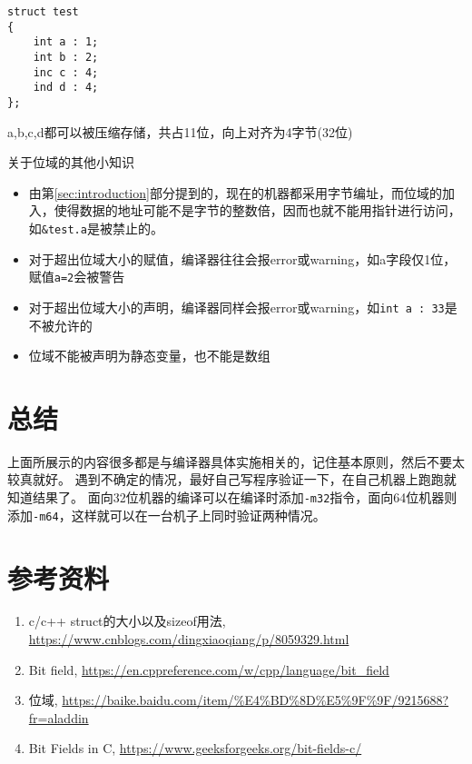\documentclass[compact]{note}
\begin{document}
\begin{example}
\begin{lstlisting}
struct test
{
    int a : 1;
    int b : 2;
    inc c : 4;
    ind d : 4;
};
\end{lstlisting}
\end{example}
\begin{analysis}
a,b,c,d都可以被压缩存储，共占11位，向上对齐为4字节(32位)
\end{analysis}

关于位域的其他小知识
\begin{itemize}
	\itemsep -3pt
	\item 由第\ref{sec:introduction}部分提到的，现在的机器都采用字节编址，而位域的加入，使得数据的地址可能不是字节的整数倍，因而也就不能用指针进行访问，如\verb'&test.a'是被禁止的。
	\item 对于超出位域大小的赋值，编译器往往会报error或warning，如a字段仅1位，赋值\verb'a=2'会被警告
	\item 对于超出位域大小的声明，编译器同样会报error或warning，如\verb'int a : 33'是不被允许的
	\item 位域不能被声明为静态变量，也不能是数组
\end{itemize}

\section{总结}
上面所展示的内容很多都是与编译器具体实施相关的，记住基本原则，然后不要太较真就好。
遇到不确定的情况，最好自己写程序验证一下，在自己机器上跑跑就知道结果了。
面向32位机器的编译可以在编译时添加\verb'-m32'指令，面向64位机器则添加\verb'-m64'，这样就可以在一台机子上同时验证两种情况。

\section{参考资料}
\begin{enumerate}
	\itemsep -3pt
	\item c/c++ struct的大小以及sizeof用法, \url{https://www.cnblogs.com/dingxiaoqiang/p/8059329.html}
	\item Bit field, \url{https://en.cppreference.com/w/cpp/language/bit_field}
	\item 位域, \url{https://baike.baidu.com/item/%E4%BD%8D%E5%9F%9F/9215688?fr=aladdin}
	\item Bit Fields in C, \url{https://www.geeksforgeeks.org/bit-fields-c/}
\end{enumerate}
\end{document}
